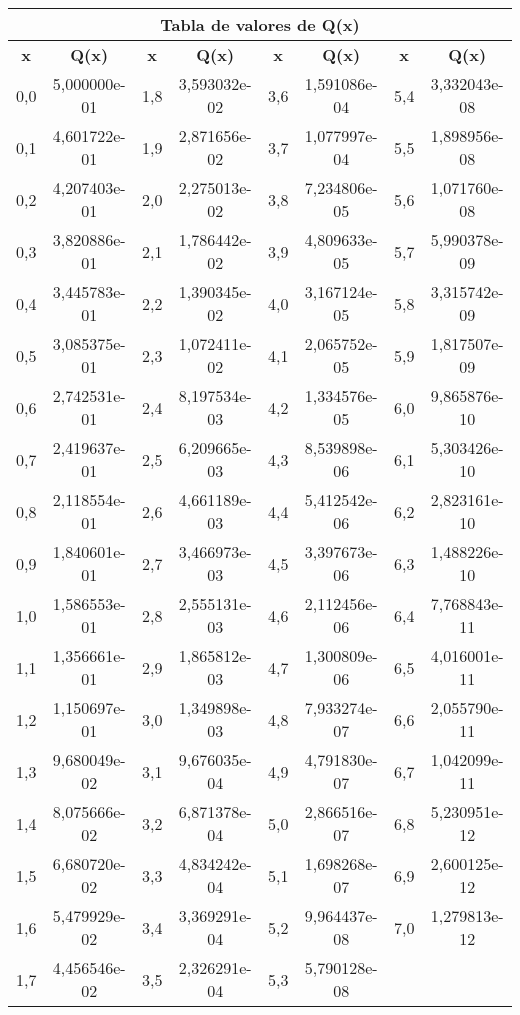 \documentclass[12pt,es,blanco]{uah}
\begin{document}
\begin{center}
    \begin{tabular}{cc|cc|cc|cc}
        \multicolumn{8}{c}{{\bf Tabla de valores de Q(x)}} \\
        \hline
        {\bf x} & {\bf Q(x)} & {\bf x} & {\bf Q(x)} & {\bf x} & {\bf Q(x)} & {\bf x} & {\bf Q(x)} \\
        \hline
        0,0 & 5,000000e-01 & 1,8 & 3,593032e-02 & 3,6 & 1,591086e-04 & 5,4 & 3,332043e-08 \\
        0,1 & 4,601722e-01 & 1,9 & 2,871656e-02 & 3,7 & 1,077997e-04 & 5,5 & 1,898956e-08 \\
        0,2 & 4,207403e-01 & 2,0 & 2,275013e-02 & 3,8 & 7,234806e-05 & 5,6 & 1,071760e-08 \\
        0,3 & 3,820886e-01 & 2,1 & 1,786442e-02 & 3,9 & 4,809633e-05 & 5,7 & 5,990378e-09 \\
        0,4 & 3,445783e-01 & 2,2 & 1,390345e-02 & 4,0 & 3,167124e-05 & 5,8 & 3,315742e-09 \\
        0,5 & 3,085375e-01 & 2,3 & 1,072411e-02 & 4,1 & 2,065752e-05 & 5,9 & 1,817507e-09 \\
        0,6 & 2,742531e-01 & 2,4 & 8,197534e-03 & 4,2 & 1,334576e-05 & 6,0 & 9,865876e-10 \\
        0,7 & 2,419637e-01 & 2,5 & 6,209665e-03 & 4,3 & 8,539898e-06 & 6,1 & 5,303426e-10 \\
        0,8 & 2,118554e-01 & 2,6 & 4,661189e-03 & 4,4 & 5,412542e-06 & 6,2 & 2,823161e-10 \\
        0,9 & 1,840601e-01 & 2,7 & 3,466973e-03 & 4,5 & 3,397673e-06 & 6,3 & 1,488226e-10 \\
        1,0 & 1,586553e-01 & 2,8 & 2,555131e-03 & 4,6 & 2,112456e-06 & 6,4 & 7,768843e-11 \\
        1,1 & 1,356661e-01 & 2,9 & 1,865812e-03 & 4,7 & 1,300809e-06 & 6,5 & 4,016001e-11 \\
        1,2 & 1,150697e-01 & 3,0 & 1,349898e-03 & 4,8 & 7,933274e-07 & 6,6 & 2,055790e-11 \\
        1,3 & 9,680049e-02 & 3,1 & 9,676035e-04 & 4,9 & 4,791830e-07 & 6,7 & 1,042099e-11 \\
        1,4 & 8,075666e-02 & 3,2 & 6,871378e-04 & 5,0 & 2,866516e-07 & 6,8 & 5,230951e-12 \\
        1,5 & 6,680720e-02 & 3,3 & 4,834242e-04 & 5,1 & 1,698268e-07 & 6,9 & 2,600125e-12 \\
        1,6 & 5,479929e-02 & 3,4 & 3,369291e-04 & 5,2 & 9,964437e-08 & 7,0 & 1,279813e-12 \\
        1,7 & 4,456546e-02 & 3,5 & 2,326291e-04 & 5,3 & 5,790128e-08 & \\                 
    \end{tabular}
    \renewcommand{\arraystretch}{1}
    \vspace{0.5cm}

\end{center}
\end{document}
